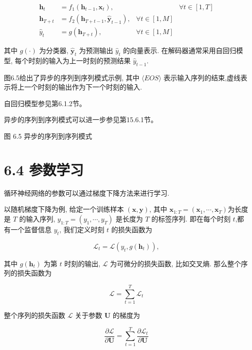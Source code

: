\documentclass[10pt]{article}
\begin{document}
\[
\begin{array}{rlrl}
\boldsymbol{h}_{t} & =f_{1}\left(\boldsymbol{h}_{t-1}, \boldsymbol{x}_{t}\right), & & \forall t \in[1, T] \\
\boldsymbol{h}_{T+t} & =f_{2}\left(\boldsymbol{h}_{T+t-1}, \hat{\boldsymbol{y}}_{t-1}\right), & \forall t \in[1, M] \\
\hat{y}_{t} & =g\left(\boldsymbol{h}_{T+t}\right), & \forall t \in[1, M] \tag{6.27}
\end{array}
\]

其中 $g(\cdot)$ 为分类器, $\hat{\boldsymbol{y}}_{t}$ 为预测输出 $\hat{y}_{t}$ 的向量表示. 在解码器通常采用自回归模型, 每个时刻的输入为上一时刻的预测结果 $\hat{y}_{t-1}$.

图6.5给出了异步的序列到序列模式示例, 其中 $\langle E O S\rangle$ 表示输入序列的结束,虚线表示将上一个时刻的输出作为下一个时刻的输入.



自回归模型参见第6.1.2节。

异步的序列到序列模式可以进一步参见第15.6.1节。

图 6.5 异步的序列到序列模式

\section*{6.4 参数学习}
循环神经网络的参数可以通过梯度下降方法来进行学习.

以随机梯度下降为例, 给定一个训练样本 $(\boldsymbol{x}, \boldsymbol{y})$, 其中 $\boldsymbol{x}_{1: T}=\left(\boldsymbol{x}_{1}, \cdots, \boldsymbol{x}_{T}\right)$为长度是 $T$ 的输入序列, $y_{1: T}=\left(y_{1}, \cdots, y_{T}\right)$ 是长度为 $T$ 的标签序列. 即在每个时刻 $t$,都有一个监督信息 $y_{t}$, 我们定义时刻 $t$ 的损失函数为


\begin{equation*}
\mathcal{L}_{t}=\mathcal{L}\left(y_{t}, g\left(\boldsymbol{h}_{t}\right)\right), \tag{6.28}
\end{equation*}


其中 $g\left(\boldsymbol{h}_{t}\right)$ 为第 $t$ 时刻的输出, $\mathcal{L}$ 为可微分的损失函数, 比如交叉熵. 那么整个序列的损失函数为


\begin{equation*}
\mathcal{L}=\sum_{t=1}^{T} \mathcal{L}_{t} \tag{6.29}
\end{equation*}


整个序列的损失函数 $\mathcal{L}$ 关于参数 $\boldsymbol{U}$ 的梯度为


\begin{equation*}
\frac{\partial \mathcal{L}}{\partial \boldsymbol{U}}=\sum_{t=1}^{T} \frac{\partial \mathcal{L}_{t}}{\partial \boldsymbol{U}} \tag{6.30}
\end{equation*}
\end{document}
